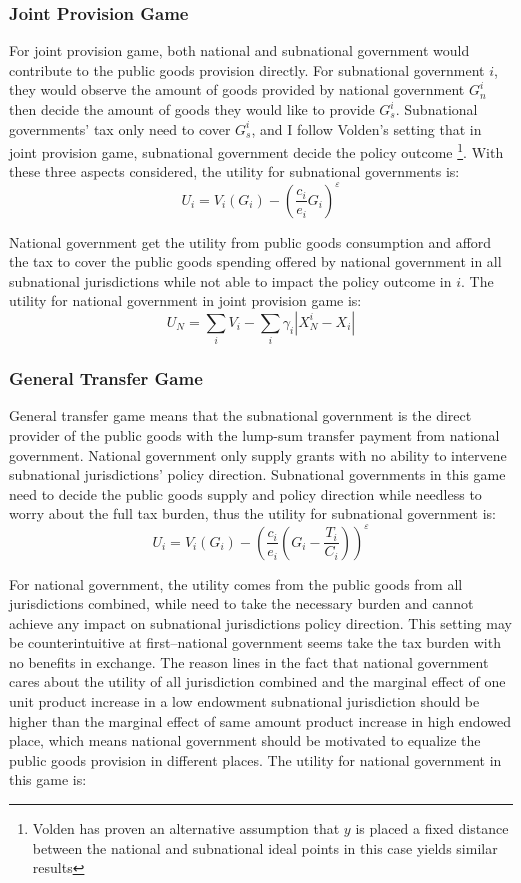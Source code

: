 \begin{itemize}
\subsubsection{Joint Provision Game}
For joint provision game, both national and subnational government would contribute to the public goods provision directly. For subnational government $i$, they would observe the amount of goods provided by national government $G_n^i$ then decide the amount of goods they would like to provide $G_s^i$. Subnational governments' tax only need to cover $G_s^i$, and I follow Volden's setting that in joint provision game, subnational government decide the policy outcome \footnote{Volden has proven an alternative assumption that $y$ is placed a fixed distance between the national and subnational ideal points in this case yields similar results}. With these three aspects considered, the utility for subnational governments is:
$$U_i=V_i\left(G_i\right)-\left(\frac{c_i}{e_i} G_i\right)^{\varepsilon}$$

National government get the utility from public goods consumption and afford the tax to cover the public goods spending offered by national government in all subnational jurisdictions while not able to impact the policy outcome in $i$. The utility for national government in joint provision game is:
$$U_N=\sum_i V_i-\sum_i \gamma_i\left|X_N^i-X_i\right|$$


\subsubsection{General Transfer Game}
General transfer game means that the subnational government is the direct provider of the public goods with the lump-sum transfer payment from national government. National government only supply grants with no ability to intervene subnational jurisdictions' policy direction. Subnational governments in this game need to decide the public goods supply and policy direction while needless to worry about the full tax burden, thus the utility for subnational government is:
$$U_i=V_i\left(G_i\right)-\left(\frac{c_i}{e_i}\left(G_i-\frac{T_i}{C_i}\right)\right)^{\varepsilon}$$

For national government, the utility comes from the public goods from all jurisdictions combined, while need to take the necessary burden and cannot achieve any impact on subnational jurisdictions policy direction. This setting may be counterintuitive at first--national government seems take the tax burden with no benefits in exchange. The reason lines in the fact that national government cares about the utility of all jurisdiction combined and the marginal effect of one unit product increase in a low endowment subnational jurisdiction should be higher than the marginal effect of same amount product increase in high endowed place, which means national government should be motivated to equalize the public goods provision in different places. The utility for national government in this game is:


\end{itemize}
